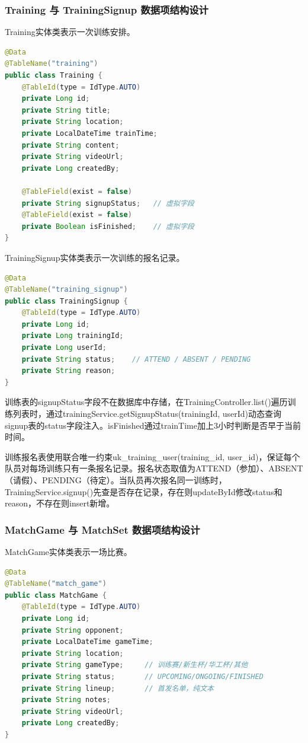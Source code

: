 \documentclass[12pt,a4paper]{ctexart}
\begin{document}
\subsubsection{Training 与 TrainingSignup 数据项结构设计}

Training实体类表示一次训练安排。

\begin{lstlisting}[language=Java, caption=Training.java]
@Data
@TableName("training")
public class Training {
    @TableId(type = IdType.AUTO)
    private Long id;
    private String title;
    private String location;
    private LocalDateTime trainTime;
    private String content;
    private String videoUrl;
    private Long createdBy;

    @TableField(exist = false)
    private String signupStatus;   // 虚拟字段
    @TableField(exist = false)
    private Boolean isFinished;    // 虚拟字段
}
\end{lstlisting}

TrainingSignup实体类表示一次训练的报名记录。

\begin{lstlisting}[language=Java, caption=TrainingSignup.java]
@Data
@TableName("training_signup")
public class TrainingSignup {
    @TableId(type = IdType.AUTO)
    private Long id;
    private Long trainingId;
    private Long userId;
    private String status;    // ATTEND / ABSENT / PENDING
    private String reason;
}
\end{lstlisting}

训练表的signupStatus字段不在数据库中存储，在TrainingController.list()遍历训练列表时，通过trainingService.getSignupStatus(trainingId, userId)动态查询signup表的status字段注入。isFinished通过trainTime加上3小时判断是否早于当前时间。

训练报名表使用联合唯一约束uk\_training\_user(training\_id, user\_id)，保证每个队员对每场训练只有一条报名记录。报名状态取值为ATTEND（参加）、ABSENT（请假）、PENDING（待定）。当队员再次报名同一训练时，TrainingService.signup()先查是否存在记录，存在则updateById修改status和reason，不存在则insert新增。

\subsubsection{MatchGame 与 MatchSet 数据项结构设计}

MatchGame实体类表示一场比赛。

\begin{lstlisting}[language=Java, caption=MatchGame.java]
@Data
@TableName("match_game")
public class MatchGame {
    @TableId(type = IdType.AUTO)
    private Long id;
    private String opponent;
    private LocalDateTime gameTime;
    private String location;
    private String gameType;     // 训练赛/新生杯/华工杯/其他
    private String status;       // UPCOMING/ONGOING/FINISHED
    private String lineup;       // 首发名单，纯文本
    private String notes;
    private String videoUrl;
    private Long createdBy;
}
\end{lstlisting}
\end{document}
